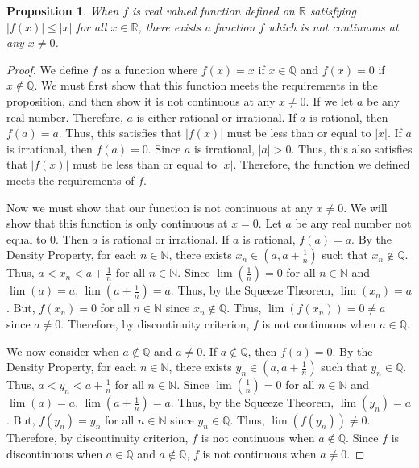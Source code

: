 \documentclass[11 pt]{article}
\newtheorem{proposition}{Proposition}
\newcommand{\newpar}{\vspace{.15in}\noindent}
\begin{document}
\begin{proposition}
When $f$ is real valued function defined on $\mathbb{R}$ satisfying $\lvert f(x)\rvert\le\lvert x\rvert$ for all $x\in\mathbb{R}$, there exists a function $f$ which is not continuous at any $x\neq0$.

\end{proposition}
\begin{proof}
We define $f$ as a function where $f(x)=x$ if $x\in\mathbb{Q}$ and $f(x)=0$ if $x\not\in\mathbb{Q}$. We must first show that this function meets the requirements in the proposition, and then show it is not continuous at any $x\neq0$. If we let $a$ be any real number. Therefore, $a$ is either rational or irrational. If $a$ is rational, then $f(a)=a$. Thus, this satisfies that $\lvert f(x)\rvert$ must be less than or equal to $\lvert x \rvert$. If $a$ is irrational, then $f(a)=0$. Since $a$ is irrational, $\lvert a\rvert>0$. Thus, this also satisfies that $\lvert f(x)\rvert$ must be less than or equal to $\lvert x \rvert$. Therefore, the function we defined meets the requirements of $f$.


\newpar
Now we must show that our function is not continuous at any $x\neq0$. We will show that this function is only continuous at $x=0$. Let $a$ be any real number not equal to 0. Then $a$ is rational or irrational. If $a$ is rational, $f(a)=a$. By the Density Property, for each $n\in\mathbb{N}$, there exists $x_n\in(a,a+\frac{1}{n})$ such that $x_n\not\in\mathbb{Q}$. Thus, $a<x_n<a+\frac{1}{n}$ for all $n\in\mathbb{N}$. Since $\lim(\frac{1}{n})=0$ for all $n\in\mathbb{N}$ and $\lim(a)=a$, $\lim(a+\frac{1}{n})=a$. Thus, by the Squeeze Theorem, $\lim(x_n)=a$. But, $f(x_n)=0$ for all $n\in\mathbb{N}$ since $x_n\not\in\mathbb{Q}$. Thus, $\lim(f(x_n))=0\neq a$ since $a\neq0$. Therefore, by discontinuity criterion, $f$ is not continuous when $a\in\mathbb{Q}$.

\newpar
We now consider when $a\not\in\mathbb{Q}$ and $a\neq 0$. If $a\not\in\mathbb{Q}$, then $f(a)=0$. By the Density Property, for each $n\in\mathbb{N}$, there exists $y_n\in(a,a+\frac{1}{n})$ such that $y_n\in\mathbb{Q}$. Thus, $a<y_n<a+\frac{1}{n}$ for all $n\in\mathbb{N}$. Since $\lim(\frac{1}{n})=0$ for all $n\in\mathbb{N}$ and $\lim(a)=a$, $\lim(a+\frac{1}{n})=a$. Thus, by the Squeeze Theorem, $\lim(y_n)=a$. But, $f(y_n)=y_n$ for all $n\in\mathbb{N}$ since $y_n\in\mathbb{Q}$. Thus, $\lim(f(y_n))\neq0$. Therefore, by discontinuity criterion, $f$ is not continuous when $a\not\in\mathbb{Q}$. Since $f$ is discontinuous when $a\in\mathbb{Q}$ and $a\not\in\mathbb{Q}$, $f$ is not continuous when $a\neq0$.


\end{proof}
\end{document}
